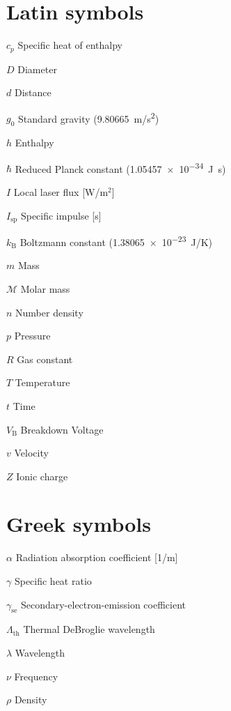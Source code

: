 \begin{multicols*}{2}
    \section*{Latin symbols}
    \begin{nomlist}
        \item[$c_p$]            Specific heat of enthalpy
        \item[$D$]              Diameter
        \item[$d$]              Distance
        \item[$g_0$]            Standard gravity (9.80665~\unit{m/s^2}) 
        \item[$h$]              Enthalpy
        \item[$\hbar$]          Reduced Planck constant (\qty{1.05457e-34}{J.s})
        \item[$I$]              Local laser flux [W/m$^2$]
        \item[$I_\text{sp}$]    Specific impulse [s]
        \item[$k_\mathrm{B}$]   Boltzmann constant (\qty{1.38065e-23}{J/K})
        \item[$m$]              Mass
        \item[$\mathcal{M}$]    Molar mass
        \item[$n$]              Number density 
        \item[$p$]              Pressure
        \item[$R$]              Gas constant
        \item[$T$]              Temperature
        \item[$t$]              Time
        \item[$V_\mathrm{B}$]   Breakdown Voltage
        \item[$v$]              Velocity
        \item[$Z$]              Ionic charge
    \end{nomlist}

    \section*{Greek symbols}
    \begin{nomlist}
        \item[$\alpha$]         Radiation absorption coefficient [1/m]
        \item[$\gamma$]         Specific heat ratio
        \item[$\gamma_\mathrm{se}$]         Secondary-electron-emission coefficient
        \item[$\Lambda_\mathrm{th}$]        Thermal DeBroglie wavelength
        \item[$\lambda$]        Wavelength
        \item[$\nu$]            Frequency
        \item[$\rho$]           Density
    \end{nomlist}


\end{multicols*}
